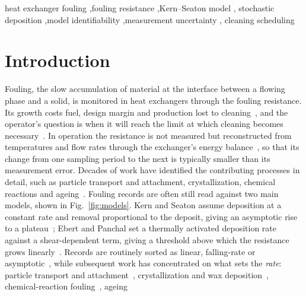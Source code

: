 \documentclass[preprint,12pt]{elsarticle}
\begin{document}
\begin{frontmatter}
\begin{keyword}
heat exchanger fouling \sep fouling resistance \sep Kern--Seaton model \sep
stochastic deposition \sep model identifiability \sep measurement uncertainty \sep
cleaning scheduling
\end{keyword}

\end{frontmatter}



\section{Introduction}
\label{sec:introduction}

Fouling, the slow accumulation of material at the interface between a
flowing phase and a solid, is monitored in heat exchangers through the fouling
resistance. Its growth costs fuel, design margin and
production lost to cleaning~\cite{Epstein1983,Bott1995,MullerSteinhagen2011},
and the operator's question is when it will reach the 
limit at which cleaning becomes 
necessary~\cite{IshiyamaCleaning2011,Pogiatzis2012}. In operation the
resistance is not measured but reconstructed from temperatures and flow rates
through the exchanger's energy balance~\cite{Tatara2011,Shen2015}, so that
its change from one sampling period to the next is typically smaller than its
measurement error. Decades of work have
identified the contributing processes in detail, such as
particle transport and attachment, crystallization, chemical reactions and ageing~\cite{Taborek1972a,Somerscales1990,MullerSteinhagen2011,AugustinMeloWilson2025}.
Fouling records are often still read against two main models, shown in Fig.~\ref{fig:models}.
Kern and Seaton
assume deposition at a constant rate and removal proportional to the deposit,
giving an asymptotic rise to a plateau~\cite{KernSeaton1959}; Ebert and
Panchal set a thermally activated deposition rate against a shear-dependent
term, giving a threshold above which the resistance grows
linearly~\cite{EbertPanchal1997}.
Records are routinely sorted as linear, falling-rate or
asymptotic~\cite{Epstein1983,Somerscales1990,Bott1995,MullerSteinhagen2011},
while subsequent work has concentrated on what sets the \emph{rate}: particle
transport and
attachment~\cite{Yao1971,Epstein1988,Bohnet1987,Kostoglou1998,Brahim2003,Han2019},
crystallization and wax deposition~\cite{Maddahi2019,Akbarzadeh2008},
chemical-reaction fouling~\cite{WatkinsonWilson1997,EP6,EP4,EP3,EP2,EP1,Wilson24052017,Geddert2009,Mayer2013,YangCFD2020},
ageing~\cite{EP5,Ishiyama2011,IshiyamaAgeing2013,ColettiMacchietto2011,DiazBejarano2015,ColettiCrittenden2015,Diaz-Bejarano24052017}
\end{document}
